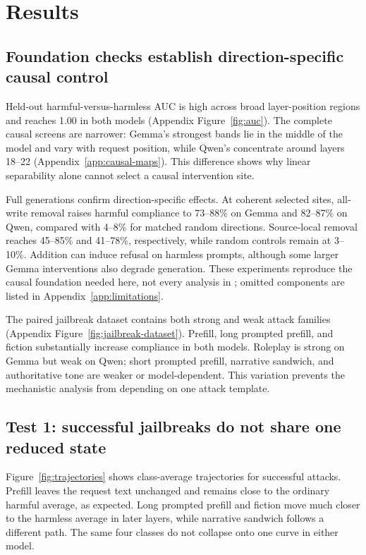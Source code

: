 \documentclass{article}
\begin{document}
\section{Results}

\subsection{Foundation checks establish direction-specific causal control}
\label{sec:foundation}

Held-out harmful-versus-harmless AUC is high across broad layer-position regions and reaches 1.00 in both models (Appendix Figure~\ref{fig:auc}). The complete causal screens are narrower: Gemma's strongest bands lie in the middle of the model and vary with request position, while Qwen's concentrate around layers 18--22 (Appendix~\ref{app:causal-maps}). This difference shows why linear separability alone cannot select a causal intervention site.

Full generations confirm direction-specific effects. At coherent selected sites, all-write removal raises harmful compliance to 73--88\% on Gemma and 82--87\% on Qwen, compared with 4--8\% for matched random directions. Source-local removal reaches 45--85\% and 41--78\%, respectively, while random controls remain at 3--10\%. Addition can induce refusal on harmless prompts, although some larger Gemma interventions also degrade generation. These experiments reproduce the causal foundation needed here, not every analysis in \citet{arditi2024refusal}; omitted components are listed in Appendix~\ref{app:limitations}.

The paired jailbreak dataset contains both strong and weak attack families (Appendix Figure~\ref{fig:jailbreak-dataset}). Prefill, long prompted prefill, and fiction substantially increase compliance in both models. Roleplay is strong on Gemma but weak on Qwen; short prompted prefill, narrative sandwich, and authoritative tone are weaker or model-dependent. This variation prevents the mechanistic analysis from depending on one attack template.

\subsection{Test 1: successful jailbreaks do not share one reduced state}
\label{sec:natural-change}

Figure~\ref{fig:trajectories} shows class-average trajectories for successful attacks. Prefill leaves the request text unchanged and remains close to the ordinary harmful average, as expected. Long prompted prefill and fiction move much closer to the harmless average in later layers, while narrative sandwich follows a different path. The same four classes do not collapse onto one curve in either model.
\end{document}
